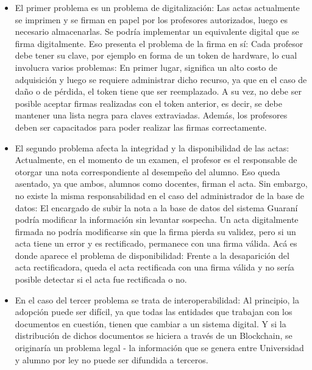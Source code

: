 \begin{itemize}
\item El primer problema es un problema de digitalización: Las actas actualmente se imprimen y se firman en papel por los profesores autorizados, luego es necesario almacenarlas. Se podría implementar un equivalente digital que se firma digitalmente. Eso presenta el problema de la firma en sí: Cada profesor debe tener su clave, por ejemplo en forma de un token de hardware, lo cual involucra varios problemas: En primer lugar, significa un alto costo de adquisición y luego se requiere administrar dicho recurso, ya que en el caso de daño o de pérdida, el token tiene que ser reemplazado. A su vez, no debe ser posible aceptar firmas realizadas con el token anterior, es decir, se debe mantener una lista negra para claves extraviadas. Además, los profesores deben ser capacitados para poder realizar las firmas correctamente. 

\item El segundo problema afecta la integridad y la disponibilidad de las actas: Actualmente, en el momento de un examen, el profesor es el responsable de otorgar una nota correspondiente al desempeño del alumno. Eso queda asentado, ya que ambos, alumnos como docentes, firman el acta. Sin embargo, no existe la misma responsabilidad en el caso del administrador de la base de datos: El encargado de subir la nota a la base de datos del sistema Guaraní podría modificar la información sin levantar sospecha. Un acta digitalmente firmada no podría modificarse sin que la firma pierda su validez, pero si un acta tiene un error y es rectificado, permanece con una firma válida. Acá es donde aparece el problema de disponibilidad: Frente a la desaparición del acta rectificadora, queda el acta rectificada con una firma válida y no sería posible detectar si el acta fue rectificada o no. 

\item En el caso del tercer problema se trata de interoperabilidad: Al principio, la adopción puede ser difícil, ya que todas las entidades que trabajan con los documentos en cuestión, tienen que cambiar a un sistema digital. Y si la distribución de dichos documentos se hiciera a través de un Blockchain, se originaría un problema legal - la información que se genera entre Universidad y alumno por ley no puede ser difundida a terceros.
\end{itemize}

